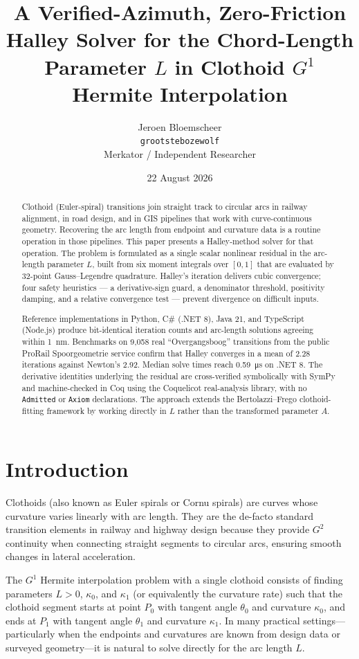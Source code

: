 \documentclass[11pt,a4paper]{article}
\title{\textbf{A Verified-Azimuth, Zero-Friction Halley Solver for the Chord-Length Parameter $L$ in Clothoid $G^1$ Hermite Interpolation}}
\author{Jeroen Bloemscheer \\ \texttt{grootstebozewolf} \\ Merkator / Independent Researcher}
\date{22 August 2026}
\begin{document}
\maketitle

\begin{abstract}
Clothoid (Euler-spiral) transitions join straight track to circular arcs in railway alignment, in road design, and in GIS pipelines that work with curve-continuous geometry. Recovering the arc length from endpoint and curvature data is a routine operation in those pipelines. This paper presents a Halley-method solver for that operation. The problem is formulated as a single scalar nonlinear residual in the arc-length parameter $L$, built from six moment integrals over $[0,1]$ that are evaluated by 32-point Gauss--Legendre quadrature. Halley's iteration delivers cubic convergence; four safety heuristics --- a derivative-sign guard, a denominator threshold, positivity damping, and a relative convergence test --- prevent divergence on difficult inputs.

Reference implementations in Python, C\# (.NET 8), Java 21, and TypeScript (Node.js) produce bit-identical iteration counts and arc-length solutions agreeing within \SI{1}{nm}. Benchmarks on 9{,}058 real ``Overgangsboog'' transitions from the public ProRail Spoorgeometrie service confirm that Halley converges in a mean of 2.28 iterations against Newton's 2.92. Median solve times reach \SI{0.59}{\micro\second} on .NET 8. The derivative identities underlying the residual are cross-verified symbolically with SymPy and machine-checked in Coq using the Coquelicot real-analysis library, with no \texttt{Admitted} or \texttt{Axiom} declarations. The approach extends the Bertolazzi--Frego clothoid-fitting framework by working directly in $L$ rather than the transformed parameter $A$.
\end{abstract}

\section{Introduction}
Clothoids (also known as Euler spirals or Cornu spirals) are curves whose curvature varies linearly with arc length. They are the de-facto standard transition elements in railway and highway design because they provide $G^2$ continuity when connecting straight segments to circular arcs, ensuring smooth changes in lateral acceleration.

The $G^1$ Hermite interpolation problem with a single clothoid consists of finding parameters $L > 0$, $\kappa_0$, and $\kappa_1$ (or equivalently the curvature rate) such that the clothoid segment starts at point $P_0$ with tangent angle $\theta_0$ and curvature $\kappa_0$, and ends at $P_1$ with tangent angle $\theta_1$ and curvature $\kappa_1$. In many practical settings---particularly when the endpoints and curvatures are known from design data or surveyed geometry---it is natural to solve directly for the arc length $L$.
\end{document}
